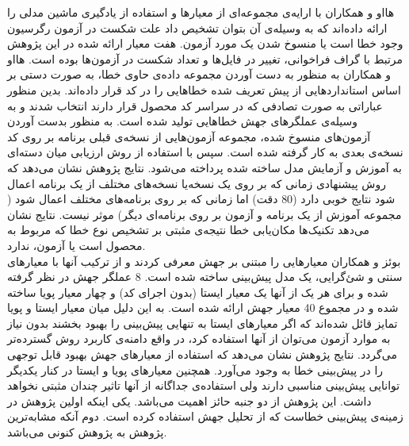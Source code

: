  هااو و همکاران با ارایه‌ی مجموعه‌ای از معیارها و استفاده از یادگیری ماشین مدلی را ارائه داده‌اند که به وسیله‌ی آن بتوان تشخیص داد علت شکست در آزمون رگرسیون وجود خطا است یا منسوخ  شدن یک مورد آزمون\cite{hao2013bug}. هفت معیار ارائه شده در این پژوهش مرتبط با گراف فراخوانی، تغییر در فایل‌ها و تعداد شکست در آزمون‌ها بوده است.  هااو و همکاران به منظور به دست آوردن مجموعه داده‌ی حاوی خطا، به صورت دستی بر اساس استانداردهایی  از پیش تعریف شده خطاهایی را در کد قرار داده‌اند. بدین منظور عباراتی به صورت تصادفی که در سراسر کد محصول قرار دارند انتخاب شدند و به وسیله‌ی عملگرهای جهش خطاهایی تولید شده است. به منظور بدست آوردن آزمون‌های منسوخ شده، مجموعه آزمون‌هایی از نسخه‌ی قبلی برنامه بر روی کد  نسخه‌ی بعدی به کار گرفته شده است. سپس با استفاده از روش ارزیابی میان دسته‌ای به آموزش و آزمایش مدل ساخته شده پرداخته می‌شود. نتایج پژوهش نشان می‌دهد که روش پیشنهادی زمانی که بر روی یک نسخه‌یا نسخه‌های مختلف از یک برنامه اعمال شود نتایج خوبی دارد (80\lr{\%} دقت) اما زمانی که بر روی برنامه‌های مختلف اعمال شود ( مجموعه آموزش از یک برنامه و آزمون بر روی برنامه‌ای دیگر) موثر نیست. نتایج نشان می‌دهد تکنیک‌ها مکان‌یابی خطا نتیجه‌ی مثبتی بر تشخیص نوع خطا که مربوط به محصول است یا آزمون، ندارد.\\
 
 بوئز و همکاران معیارهایی را مبتنی بر جهش معرفی کردند و  از ترکیب آنها با معیارهای سنتی و شئ‌گرایی، یک مدل پیش‌بینی ساخته شده است\cite{bowes2016mutation}. 8 عملگر جهش در نظر گرفته شده و برای هر یک از آنها یک معیار ایستا (بدون اجرای کد) و چهار معیار پویا ساخته شده و در مجموع 40 معیار جهش ارائه شده است. به این دلیل میان معیار ایستا و پویا تمایز قائل شده‌اند که اگر معیارهای ایستا به تنهایی  پیش‌بینی را بهبود بخشند بدون نیاز به موارد آزمون می‌توان از آنها استفاده کرد، در واقع دامنه‌ی کاربرد روش گسترده‌تر می‌گردد. نتایج پژوهش نشان می‌دهد که استفاده از معیارهای جهش بهبود قابل توجهی را در پیش‌بینی خطا به وجود می‌آورد. همچنین معیارهای پویا و ایستا در کنار یکدیگر توانایی پیش‌بینی مناسبی دارند ولی استفاده‌ی جداگانه از آنها تاثیر چندان مثبتی نخواهد داشت. این پژوهش از دو جنبه حائز اهمیت می‌باشد. یکی اینکه اولین پژوهش در زمینه‌ی پیش‌بینی خطاست که از تحلیل جهش استفاده کرده است. دوم آنکه مشابه‌ترین پژوهش به پژوهش کنونی می‌باشد. 
 
 
 
 
 
 
 
 
 
 
 
 
 
 
 
 
 
 
 
 
 

